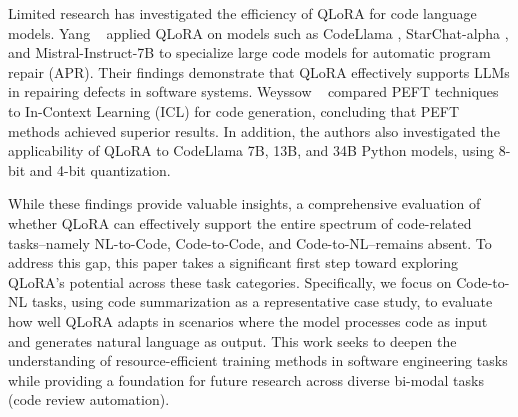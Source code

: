 Limited research has investigated the efficiency of QLoRA for code language models. Yang \etal~\cite{yang2024multi} applied QLoRA on models such as CodeLlama \cite{codellama2}, StarChat-alpha \cite{Tunstall2023starchat-alpha}, and Mistral-Instruct-7B \cite{mistral} to specialize large code models for automatic program repair (APR). Their findings demonstrate that QLoRA effectively supports LLMs in repairing defects in software systems. Weyssow \etal~\cite{weyssow2023exploring} compared PEFT techniques to In-Context Learning (ICL) for code generation, concluding that PEFT methods achieved superior results. In addition, the authors also investigated the applicability of QLoRA to CodeLlama 7B, 13B, and 34B Python models, using 8-bit and 4-bit quantization. 

While these findings provide valuable insights, a comprehensive evaluation of whether QLoRA can effectively support the entire spectrum of code-related tasks--namely NL-to-Code, Code-to-Code, and Code-to-NL--remains absent. To address this gap, this paper takes a significant first step toward exploring QLoRA’s potential across these task categories. Specifically, we focus on Code-to-NL tasks, using code summarization as a representative case study, to evaluate how well QLoRA adapts in scenarios where the model processes code as input and generates natural language as output. 
This work seeks to deepen the understanding of resource-efficient training methods in software engineering tasks while providing a foundation for future research across diverse bi-modal tasks (\eg code review automation).



